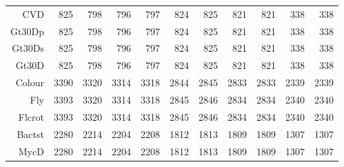 \begin{table}[p]
\begin{tabular}{rrrrrrrrrrr}
  CVD & 825 & 798 & 796 & 797 & 824 & 825 & 821 & 821 & 338 & 338 \\ 
  Gt30Dp & 825 & 798 & 796 & 797 & 824 & 825 & 821 & 821 & 338 & 338 \\ 
  Gt30Ds & 825 & 798 & 796 & 797 & 824 & 825 & 821 & 821 & 338 & 338 \\ 
  Gt30D & 825 & 798 & 796 & 797 & 824 & 825 & 821 & 821 & 338 & 338 \\ 
  Colour & 3390 & 3320 & 3314 & 3318 & 2844 & 2845 & 2833 & 2833 & 2339 & 2339 \\ 
  Fly & 3393 & 3320 & 3314 & 3318 & 2845 & 2846 & 2834 & 2834 & 2340 & 2340 \\ 
  Flcrot & 3393 & 3320 & 3314 & 3318 & 2845 & 2846 & 2834 & 2834 & 2340 & 2340 \\ 
  Bactst & 2280 & 2214 & 2204 & 2208 & 1812 & 1813 & 1809 & 1809 & 1307 & 1307 \\ 
  MycD & 2280 & 2214 & 2204 & 2208 & 1812 & 1813 & 1809 & 1809 & 1307 & 1307 \\ 
   \hline
\end{tabular}
\normalsize
\end{table}
